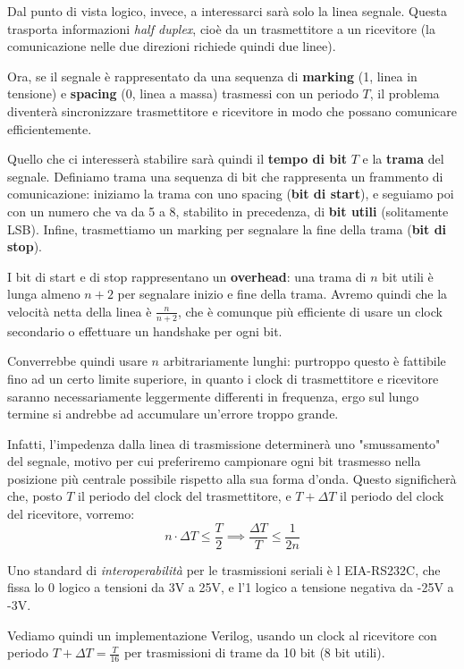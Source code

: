 \documentclass[a4paper,11pt]{article}
\begin{document}
Dal punto di vista logico, invece, a interessarci sarà solo la linea segnale.
Questa trasporta informazioni \textit{half duplex}, cioè da un trasmettitore a un ricevitore (la comunicazione nelle due direzioni richiede quindi due linee).

Ora, se il segnale è rappresentato da una sequenza di \textbf{marking} (1, linea in tensione) e \textbf{spacing} (0, linea a massa) trasmessi con un periodo $T$, il problema diventerà sincronizzare trasmettitore e ricevitore in modo che possano comunicare efficientemente. 

Quello che ci interesserà stabilire sarà quindi il \textbf{tempo di bit} $T$ e la \textbf{trama} del segnale.
Definiamo trama una sequenza di bit che rappresenta un frammento di comunicazione: iniziamo la trama con uno spacing (\textbf{bit di start}), e seguiamo poi con un numero che va da 5 a 8, stabilito in precedenza, di \textbf{bit utili} (solitamente LSB).
Infine, trasmettiamo un marking per segnalare la fine della trama (\textbf{bit di stop}).

I bit di start e di stop rappresentano un \textbf{overhead}: una trama di $n$ bit utili è lunga almeno $n+2$ per segnalare inizio e fine della trama.
Avremo quindi che la velocità netta della linea è $\frac{n}{n+2}$, che è comunque più efficiente di usare un clock secondario o effettuare un handshake per ogni bit. 

Converrebbe quindi usare $n$ arbitrariamente lunghi: purtroppo questo è fattibile fino ad un certo limite superiore, in quanto i clock di trasmettitore e ricevitore saranno necessariamente leggermente differenti in frequenza, ergo sul lungo termine si andrebbe ad accumulare un'errore troppo grande.

Infatti, l'impedenza dalla linea di trasmissione determinerà uno "smussamento" del segnale, motivo per cui preferiremo campionare ogni bit trasmesso nella posizione più centrale possibile rispetto alla sua forma d'onda.
Questo significherà che, posto $T$ il periodo del clock del trasmettitore, e $T + \Delta T$ il periodo del clock del ricevitore, vorremo:
$$
n \cdot \Delta T \leq \frac{T}{2} \implies \frac{\Delta T}{T} \leq \frac{1}{2n}
$$

Uno standard di \textit{interoperabilità} per le trasmissioni seriali è l EIA-RS232C, che fissa lo 0 logico a tensioni da 3V a 25V, e l'1 logico a tensione negativa da -25V a -3V.

Vediamo quindi un implementazione Verilog, usando un clock al ricevitore con periodo $T + \Delta T = \frac{T}{16}$ per trasmissioni di trame da 10 bit (8 bit utili).
\end{document}
